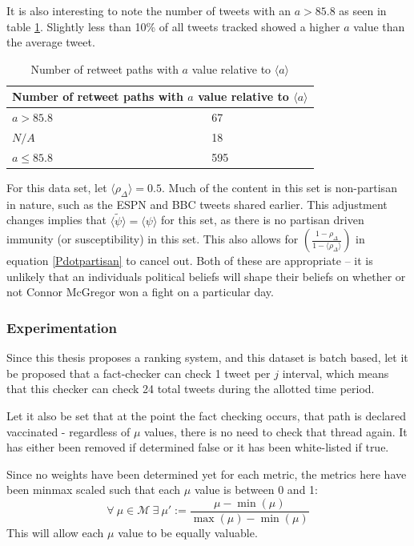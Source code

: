 \documentclass[preprint,review,12pt]{elsarticle}
\begin{document}
It is also interesting to note the number of tweets with an $a > 85.8$ as seen in table \ref{a > 85.58}. Slightly less than 10\% of all tweets tracked showed a higher $a$ value than the average tweet.
\begin{table}[h!]
\centering
\begin{tabular}{ |p{3cm}|p{3cm}|  }
\hline
\multicolumn{2}{|c|}{Number of retweet paths with $a$ value relative to $\langle a \rangle$} \\
\hline
$a > 85.8$  & 67\\
$N/A$ & 18 \\
$ a \leq 85.8$ & 595 \\
\hline
\end{tabular}
\caption{Number of retweet paths with $a$ value relative to $\langle a \rangle$}
\label{a > 85.58}
\end{table}


For this data set, let $\langle \rho_{\Delta} \rangle = 0.5$. Much of the content in this set is non-partisan in nature, such as the ESPN and BBC tweets shared earlier. This adjustment changes implies that $\langle \tilde{\psi} \rangle = \langle \psi \rangle$ for this set, as there is no partisan driven immunity (or susceptibility) in this set. This also allows for 
$\left(\frac{1-\rho_{\Delta}}{1-\langle\rho_{\Delta}\rangle}\right)$ in equation \ref{Pdotpartisan} to cancel out. Both of these are appropriate -- it is unlikely that an individuals political beliefs will shape their beliefs on whether or not Connor McGregor won a fight on a particular day. 

\subsubsection{Experimentation}
\label{sec: Twitter15 Experimentation}
Since this thesis proposes a ranking system, and this dataset is batch based, let it be proposed that a fact-checker can check 1 tweet per $j$ interval, which means that this checker can check 24 total tweets during the allotted time period.

Let it also be set that at the point the fact checking occurs, that path is declared vaccinated - regardless of $\mu$ values, there is no need to check that thread again. It has either been removed if determined false or it has been white-listed if true.

Since no weights have been determined yet for each metric, the metrics here have been minmax scaled such that each $\mu$ value is between 0 and 1: 
\[
\forall \ \mu \in \mathcal{M} \  \exists \ \mu' := \frac{\mu - \min(\mu)}{\max(\mu) - \min(\mu)} 
\]
This will allow each $\mu$ value to be equally valuable.
\end{document}
